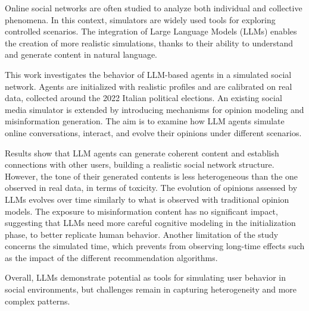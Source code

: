 Online social networks are often studied to analyze both individual and collective phenomena. 
In this context, simulators are widely used tools for exploring controlled scenarios. 
The integration of Large Language Models (LLMs) enables the creation of more realistic simulations, thanks to their ability to understand and generate content in natural language.

This work investigates the behavior of LLM-based agents in a simulated social network.
Agents are initialized with realistic profiles and are calibrated on real data, collected around the 2022 Italian political elections.
An existing social media simulator is extended by introducing mechanisms for opinion modeling and misinformation generation.
The aim is to examine how LLM agents simulate online conversations, interact, and evolve their opinions under different scenarios.

Results show that LLM agents can generate coherent content and establish connections with other users, building a realistic social network structure. 
However, the tone of their generated contents is less heterogeneous than the one observed in real data, in terms of toxicity.
The evolution of opinions assessed by LLMs evolves over time similarly to what is observed with traditional opinion models.
The exposure to misinformation content has no significant impact, suggesting that LLMs need more careful cognitive modeling in the initialization phase, to better replicate human behavior.
Another limitation of the study concerns the simulated time, which prevents from observing long-time effects such as the impact of the different recommendation algorithms.

Overall, LLMs demonstrate potential as tools for simulating user behavior in social environments, but challenges remain in capturing heterogeneity and more complex patterns.